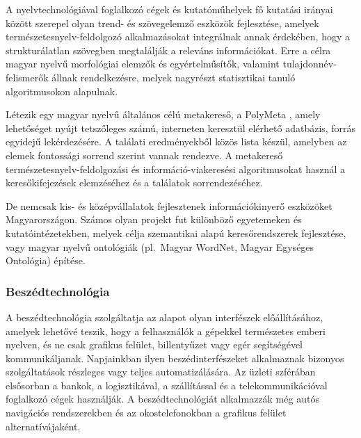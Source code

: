 \begin{multicols}{2}
  A nyelvtechnológiával foglalkozó cégek és kutatóműhelyek fő kutatási irányai között szerepel olyan trend- és szövegelemző esz\-kö\-zök fejlesztése, amelyek ter\-mé\-sze\-tes\-nyelv-feldolgozó alkalmazásokat integrálnak annak érdekében, hogy a strukturálatlan szövegben megtalálják a releváns információkat. Erre a célra magyar nyelvű morfológiai elemzők és egyértelműsítők, valamint tulajdonnév-felismerők állnak rendelkezésre, melyek nagyrészt statisztikai tanuló algoritmusokon alapulnak.

  Létezik egy magyar nyelvű általános célú metakereső, a PolyMeta \cite{polymeta}, amely le\-he\-tő\-sé\-get nyújt tetszőleges számú, interneten keresztül elérhető adatbázis, forrás egyidejű lekérdezésére. A találati eredményekből közös lista készül, amelyben az elemek fontossági sorrend szerint vannak rendezve. A metakereső természetesnyelv-feldolgozási és információ-viakeresési algoritmusokat használ a keresőkifejezések elemzéséhez és a találatok sorrendezéséhez.

  De nemcsak kis- és középvállalatok fej\-lesz\-te\-nek információkinyerő eszközöket Magyarországon. Számos olyan projekt fut különböző egyetemeken és kutatóintézetekben, melyek célja szemantikai alapú keresőrendszerek fejlesztése, vagy magyar nyelvű ontológiák (pl.~Ma\-gyar WordNet, Magyar Egységes Ontológia) építése. 

  \subsubsection{Beszédtechnológia}

  A beszédtechnológia szolgáltatja az alapot olyan interfészek előállításához, amelyek lehetővé teszik, hogy a felhasználók a gépekkel természetes emberi nyelven, és ne csak grafikus felület, billentyűzet vagy egér segítségével kommunikáljanak. Napjainkban ilyen beszédinterfészeket al\-kal\-maz\-nak bizonyos szolgáltatások részleges vagy teljes automatizálására. Az üzleti szférában elsősorban a bankok, a logisztikával, a szállítással és a telekommunikációval foglalkozó cégek használják. A beszédtechnológiát alkalmazzák még autós navigációs rendszerekben és az okostelefonokban a grafikus felület alternatívájaként.



\end{multicols}
